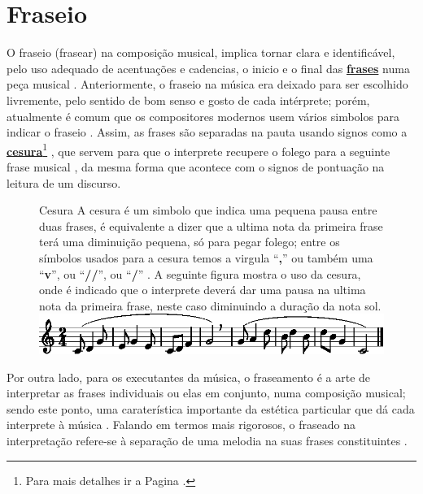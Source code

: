 \section{Fraseio}
\label{sec:fraseio}

O fraseio (frasear) na composição musical, implica  tornar clara e identificável, 
pelo uso adequado de acentuações e cadencias, 
o inicio e o final das \hyperref[sec:Frase]{\textbf{frases}} numa peça musical \cite[pp. 336]{medteoria} \cite[pp. 19]{holst1998abc}.
Anteriormente, 
o fraseio na música era deixado para ser escolhido livremente, pelo sentido de bom senso e gosto de cada intérprete;
porém, atualmente é comum que os compositores modernos usem vários simbolos para indicar o fraseio \cite[pp. 348]{stainer2009dictionary}.
Assim, as frases são separadas na pauta usando signos como a \hyperref[fig:Cesura]{\textbf{cesura}}\footnote{Para
 mais detalhes ir a Pagina \pageref{fig:Cesura}.}  \cite[pp. 668]{apel1969harvard},
que servem para que o interprete recupere o folego 
para  a seguinte frase musical \cite[pp. 18]{holst1998abc} \cite[pp. 48]{howard1991aprendendo},
da mesma forma que acontece com o signos de pontuação na leitura de um discurso.




\begin{figure}[!h]
\begin{elaboracion}{Cesura}
A cesura é um simbolo que indica uma pequena pausa entre duas frases,
é equivalente a dizer que a ultima nota da primeira frase terá uma diminuição pequena, só para pegar folego;
entre os símbolos usados para a cesura temos a virgula ``\textbf{,}'' 
ou também uma ``\textbf{v}'', ou ``\textbf{//}'', ou ``\textbf{/}'' 
\cite[pp. 252]{medteoria} \cite[pp. 18]{holst1998abc}.
A seguinte figura mostra o uso da cesura, onde é indicado que o interprete deverá 
dar uma pausa na ultima nota da primeira frase, neste caso diminuindo a duração da nota sol.\\
\includegraphics[width=\textwidth]{chapters/cap-musica-topicos/cesura1-1.eps}
\end{elaboracion}
\label{fig:Cesura}
\end{figure}
 
Por outra lado, para os executantes da música, 
o fraseamento é a arte de interpretar as frases individuais ou elas em conjunto, numa composição musical;
sendo este ponto, 
uma caraterística importante da estética particular que dá cada interprete à música 
\cite[pp. 257]{medteoria} \cite[pp. 624]{latham2008diccionario}.
Falando em termos mais rigorosos, 
o fraseado na interpretação refere-se à separação de uma melodia na suas frases constituintes 
\cite[pp. 668]{apel1969harvard}.

